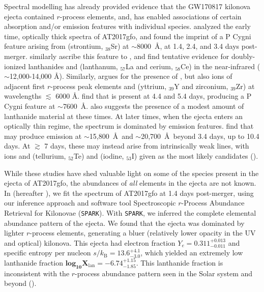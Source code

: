 \documentclass[twocolumn,twocolappendix]{aastex63}
\def\SPARK{\texttt{SPARK}}
\def\V23{\citetalias{vieira23}}
\begin{document}
Spectral modelling has already provided evidence that the GW170817 kilonova ejecta contained $r$-process elements, and, has enabled associations of certain absorption and/or emission features with individual species. \cite{watson19} analyzed the early time, optically thick spectra of AT2017gfo, and found the imprint of a P Cygni feature arising from  (strontium, ${}_{38}$Sr) at $\sim$8000~\AA, at 1.4, 2.4, and 3.4 days post-merger. \cite{domoto21, domoto22} similarly ascribe this feature to , and find tentative evidence for doubly-ionized lanthanides  and  (lanthanum, ${}_{57}$La and cerium, ${}_{58}$Ce) in the near-infrared ($\sim$12,000-14,000 \AA). Similarly, \cite{gillanders22} argues for the presence of , but also ions of adjacent first $r$-process peak elements  and  (yttrium, ${}_{39}$Y and zirconium, ${}_{39}$Zr) at wavelengths $\lesssim$ 6000 \AA. \cite{sneppenwatson23} find that  is present at 4.4 and 5.4 days, producing a P Cygni feature at $\sim$7600~\AA. \cite{gillanders22} also suggests the presence of a modest amount of lanthanide material at these times.  At later times, when the ejecta enters an optically thin regime, the spectrum is dominated by emission features. \cite{gillanders23} find that  may produce emission at $\sim$15,800~\AA~and $\sim$20,700~\AA~beyond 3.4 days, up to 10.4 days. At $\gtrsim$ 7 days, these may instead arise from intrinsically weak lines, with ions  and  (tellurium, ${}_{52}$Te) and  (iodine, ${}_{53}$I) given as the most likely candidates (\citealt{gillanders23, hotokezaka23}). 

While these studies have shed valuable light on some of the species present in the ejecta of AT2017gfo, the abundances of \textit{all} elements in the ejecta are not known. In \cite{vieira23} (hereafter \V23), we fit the spectrum of AT2017gfo at 1.4 days post-merger, using our inference approach and software tool Spectroscopic $r$-Process Abundance Retrieval for Kilonovae (\SPARK). With \SPARK, we inferred the complete elemental abundance pattern of the ejecta. We found that the ejecta was dominated by lighter $r$-process elements, generating a bluer (relatively lower opacity in the UV and optical) kilonova. This ejecta had electron fraction $Y_e = 0.311^{+0.013}_{-0.011}$ and specific entropy per nucleon $s / k_{\mathrm{B}} = 13.6^{+4.1}_{-3.0}$, which yielded an extremely low lanthanide fraction $\mathbf{log_{10} X_{\mathrm{lan}} = {-6.74}^{+1.15}_{-1.85}}$. This lanthanide fraction is inconsistent with the $r$-process abundance pattern seen in the Solar system and beyond (\citealt{ji19}). 
\end{document}
